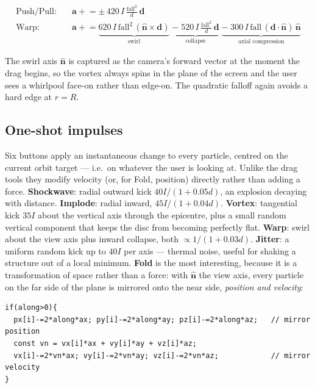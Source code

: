 \documentclass[10pt,a4paper]{article}
\begin{document}
\begin{align}
\text{Push/Pull:}\quad & \mathbf{a} \mathrel{+}= \pm\,420\,I\,\frac{\text{fall}^2}{d}\,\mathbf{d}\\[2pt]
\text{Warp:}\quad & \mathbf{a} \mathrel{+}= \underbrace{620\,I\,\text{fall}^2\,(\hat{\mathbf{n}} \times \mathbf{d})}_{\text{swirl}}
   \;\underbrace{-\;520\,I\,\frac{\text{fall}^2}{d}\,\mathbf{d}}_{\text{collapse}}
   \;\underbrace{-\;300\,I\,\text{fall}\,(\mathbf{d}\cdot\hat{\mathbf{n}})\,\hat{\mathbf{n}}}_{\text{axial compression}}
\end{align}

\noindent The swirl axis $\hat{\mathbf{n}}$ is captured as the camera's forward vector at the moment the
drag begins, so the vortex always spins in the plane of the screen and the user sees a whirlpool face-on
rather than edge-on. The quadratic falloff again avoids a hard edge at $r=R$.

\subsection{One-shot impulses}

Six buttons apply an instantaneous change to every particle, centred on the current orbit target --- i.e.\
on whatever the user is looking at. Unlike the drag tools they modify velocity (or, for Fold, position)
directly rather than adding a force. \textbf{Shockwave}: radial outward kick $40I/(1+0.05d)$, an explosion
decaying with distance. \textbf{Implode}: radial inward, $45I/(1+0.04d)$. \textbf{Vortex}: tangential kick
$35I$ about the vertical axis through the epicentre, plus a small random vertical component that keeps the
disc from becoming perfectly flat. \textbf{Warp}: swirl about the view axis plus inward collapse, both
$\propto1/(1+0.03d)$. \textbf{Jitter}: a uniform random kick up to $40I$ per axis --- thermal noise, useful
for shaking a structure out of a local minimum. \textbf{Fold} is the most interesting, because it is a
transformation of space rather than a force: with $\hat{\mathbf{n}}$ the view axis, every particle on the
far side of the plane is mirrored onto the near side, \emph{position and velocity}:

\begin{lstlisting}
if(along>0){
  px[i]-=2*along*ax; py[i]-=2*along*ay; pz[i]-=2*along*az;   // mirror position
  const vn = vx[i]*ax + vy[i]*ay + vz[i]*az;
  vx[i]-=2*vn*ax; vy[i]-=2*vn*ay; vz[i]-=2*vn*az;            // mirror velocity
}
\end{lstlisting}
\end{document}
